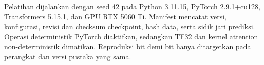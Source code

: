 Pelatihan dijalankan dengan seed 42 pada Python 3.11.15, PyTorch 2.9.1+cu128,
Transformers 5.15.1, dan GPU RTX 5060 Ti. Manifest mencatat versi, konfigurasi,
revisi dan checksum checkpoint, hash data, serta sidik jari prediksi. Operasi
deterministik PyTorch diaktifkan, sedangkan TF32 dan kernel attention
non-deterministik dimatikan. Reproduksi bit demi bit hanya ditargetkan pada
perangkat dan versi pustaka yang sama.
